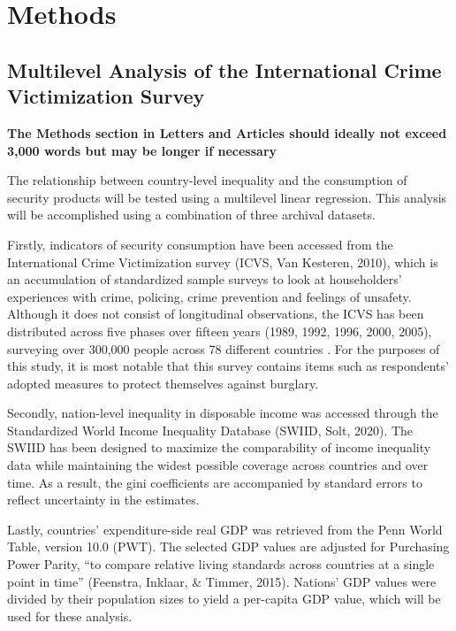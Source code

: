 \documentclass[
  english,
  man]{apa6}
\begin{document}
\hypertarget{methods}{%
\section{Methods}\label{methods}}

\hypertarget{multilevel-analysis-of-the-international-crime-victimization-survey}{%
\subsection{Multilevel Analysis of the International Crime Victimization Survey}\label{multilevel-analysis-of-the-international-crime-victimization-survey}}

\textbf{The Methods section in Letters and Articles should ideally not exceed 3,000 words but may be longer if necessary}

The relationship between country-level inequality and the consumption of security products will be tested using a multilevel linear regression. This analysis will be accomplished using a combination of three archival datasets.

Firstly, indicators of security consumption have been accessed from the International Crime Victimization survey (ICVS, Van Kesteren, 2010), which is an accumulation of standardized sample surveys to look at householders' experiences with crime, policing, crime prevention and feelings of unsafety. Although it does not consist of longitudinal observations, the ICVS has been distributed across five phases over fifteen years (1989, 1992, 1996, 2000, 2005), surveying over 300,000 people across 78 different countries . For the purposes of this study, it is most notable that this survey contains items such as respondents' adopted measures to protect themselves against burglary.

Secondly, nation-level inequality in disposable income was accessed through the Standardized World Income Inequality Database (SWIID, Solt, 2020). The SWIID has been designed to maximize the comparability of income inequality data while maintaining the widest possible coverage across countries and over time. As a result, the gini coefficients are accompanied by standard errors to reflect uncertainty in the estimates.

Lastly, countries' expenditure-side real GDP was retrieved from the Penn World Table, version 10.0 (PWT). The selected GDP values are adjusted for Purchasing Power Parity, ``to compare relative living standards across countries at a single point in time'' (Feenstra, Inklaar, \& Timmer, 2015). Nations' GDP values were divided by their population sizes to yield a per-capita GDP value, which will be used for these analysis.
\end{document}
